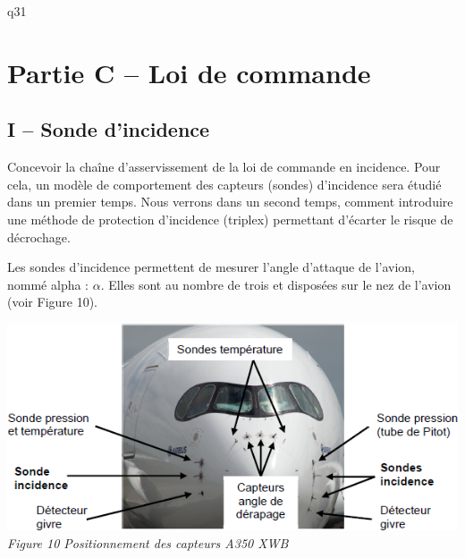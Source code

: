 \begin{multicols}{2}
{\begin{question}{q31}
\begin{reponses}


\end{reponses} \end{question}}  



\section*{Partie C -- Loi de commande}
\subsection*{I -- Sonde d'incidence}
\begin{obj}
Concevoir la chaîne d’asservissement de la loi de commande en incidence. Pour cela, un
modèle de comportement des capteurs (sondes) d’incidence sera étudié dans un premier
temps. Nous verrons dans un second temps, comment introduire une méthode de protection
d’incidence (triplex) permettant d’écarter le risque de décrochage.
\end{obj}

Les sondes d’incidence permettent de mesurer l’angle d’attaque de l’avion, nommé alpha : $\alpha$. Elles sont au
nombre de trois et disposées sur le nez de l’avion (voir Figure 10).

\begin{center}
\includegraphics[width=\linewidth]{images/fig_13}
\textit{Figure 10 Positionnement des capteurs A350 XWB}
\end{center}


\end{multicols}
